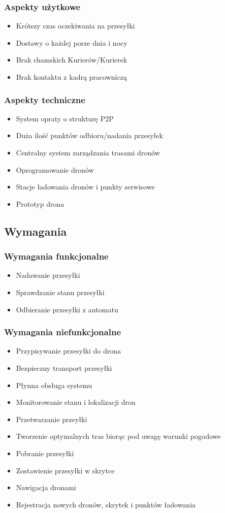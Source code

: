 \documentclass[11pt]{article}
\begin{document}
\subsubsection{Aspekty użytkowe}
\begin{itemize}
\item Krótszy czas oczekiwania na przesyłki
\item Dostawy o każdej porze dnia i nocy
\item Brak chamskich Kurierów/Kurierek
\item Brak kontaktu z kadrą pracowniczą
\end{itemize}

\subsubsection{Aspekty techniczne}
\begin{itemize}
\item System opraty o strukturę P2P
\item Duża ilość punktów odbioru/nadania przesyłek
\item Centralny system zarządzania trasami dronów
\item Oprogramowanie dronów
\item Stacje ładowania dronów i punkty serwisowe
\item Prototyp drona
\end{itemize}

\subsection{Wymagania}
\subsubsection{Wymagania funkcjonalne}
\begin{itemize}
\item Nadawanie przesyłki
\item Sprawdzanie stanu przesyłki
\item Odbieranie przesyłki z automatu
\end{itemize}
\subsubsection{Wymagania niefunkcjonalne}
\begin{itemize}
\item Przypisywanie przesyłki do drona
\item Bezpieczny transport przesyłki
\item Płynna obsługa systemu
\item Monitorowanie stanu i lokalizacji dron
\item Przetwarzanie przeyłki
\item Tworzenie optymalnych tras biorąc pod uwagę warunki pogodowe
\item Pobranie przesyłki
\item Zostawienie przesyłki w skrytce
\item Nawigacja dronami
\item Rejestracja nowych dronów, skrytek i punktów ładowania
\end{itemize}
\end{document}
